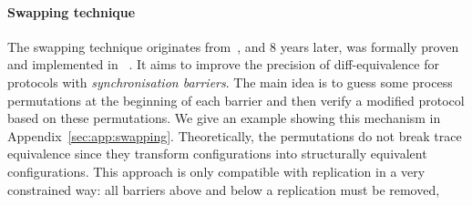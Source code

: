 \paragraph{\textbf{Swapping technique}}
\label{sec:rel:swapping}
The swapping technique originates
from~\cite{vote-ifip}, and 8 years later, was formally proven and
implemented in 
\proverif~\cite{vote-CSF16}.
It aims to improve the precision of diff-equivalence for protocols with {\em synchronisation barriers}.
The main idea is to guess some process permutations 
at the beginning of each barrier and then verify a
modified protocol based on these permutations.
We give an example showing this mechanism in Appendix~\ref{sec:app:swapping}.
Theoretically, the permutations do not break trace equivalence since they transform configurations
into structurally equivalent configurations.
This approach is only compatible with replication in a very constrained way:
all barriers above and below a replication must be
removed,
